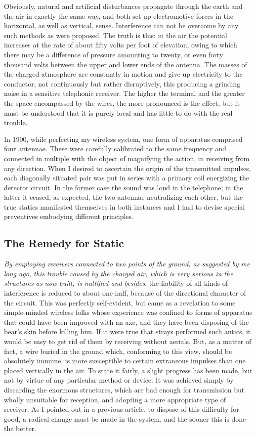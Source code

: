 \documentclass[a4paper,12pt,english,twoside,openright]{memoir}
\begin{document}
 Obviously, natural and artificial disturbances propagate through 
the earth and the air in exactly the same way, and both set up electromotive forces in the 
horizontal, as well as vertical, sense.  Interference can not be overcome by any such methods as 
were proposed.  The truth is this: in the air the potential increases at the rate of about fifty volts 
per foot of elevation, owing to which there may be a difference of pressure amounting to twenty, 
or even forty thousand volts between the upper and lower ends of the antenna.  The masses of 
the charged atmosphere are constantly in motion and give up electricity to the conductor, not 
continuously but rather disruptively, this producing a grinding noise in a sensitive telephonic 
receiver.  The higher the terminal and the greater the space encompassed by the wires, the more 
pronounced is the effect, but it must be understood that it is purely local and has little to do with 
the real trouble.  

In 1900, while perfecting my wireless system, one form of apparatus comprised four antennae.  
These were carefully calibrated to the same frequency and connected in multiple with the object 
of magnifying the action, in receiving from any direction.  When I desired to ascertain the origin of 
the transmitted impulses, each diagonally situated pair was put in series with a primary coil 
energizing the detector circuit.  In the former case the sound was loud in the telephone; in the 
latter it ceased, as expected, the two antennae neutralizing each other, but the true statics 
manifested themselves in both instances and I had to devise special preventives embodying 
different principles.  

\subsection{The Remedy for Static}
\emph{By employing receivers connected to two points of the ground, as suggested by me long ago, this 
trouble caused by the charged air, which is very serious in the structures as now built, is nullified and besides}, the liability of all kinds of interference is reduced to about one-half, because of the 
directional character of the circuit.  This was perfectly self-evident, but came as a revelation to 
some simple-minded wireless folks whose experience was confined to forms of apparatus that 
could have been improved with an axe, and they have been disposing of the bear's skin before 
killing him.  If it were true that strays performed such antics, it would be easy to get rid of them by 
receiving without aerials.  But, as a matter of fact, a wire buried in the ground which, conforming 
to this view, should be absolutely immune, is more susceptible to certain extraneous impulses 
than one placed vertically in the air.  To state it fairly, a slight progress has been made, but not by 
virtue of any particular method or device.  It was achieved simply by discarding the enormous 
structures, which are bad enough for transmission but wholly unsuitable for reception, and 
adopting a more appropriate type of receiver.  As I pointed out in a previous article, to dispose of 
this difficulty for good, a radical change must be made in the system, and the sooner this is done 
the better.  
\end{document}
